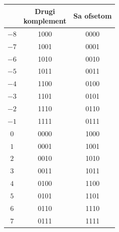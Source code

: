 \begin{tabular}{ccc}\toprule
&\makecell{Drugi\\komplement}&Sa ofsetom\\\midrule
$-8$&1000&0000\\
$-7$&1001&0001\\
$-6$&1010&0010\\
$-5$&1011&0011\\
$-4$&1100&0100\\
$-3$&1101&0101\\
$-2$&1110&0110\\
$-1$&1111&0111\\
\midrule
$0$&0000&1000\\
$1$&0001&1001\\
$2$&0010&1010\\
$3$&0011&1011\\
$4$&0100&1100\\
$5$&0101&1101\\
$6$&0110&1110\\
$7$&0111&1111\\
\bottomrule\end{tabular}
